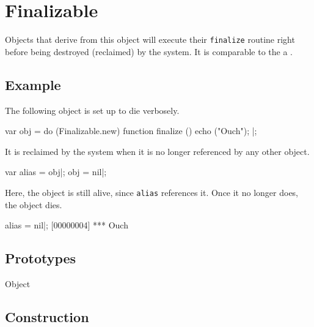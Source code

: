 
\section{Finalizable}

Objects that derive from this object will execute their
\lstinline|finalize| routine right before being destroyed (reclaimed)
by the system.  It is comparable to the a .

\subsection{Example}

The following object is set up to die verbosely.

\begin{urbiscript}
var obj =
  do (Finalizable.new)
  {
    function finalize ()
    {
      echo ("Ouch");
    }
  }|;
\end{urbiscript}

\noindent
It is reclaimed by the system when it is no longer referenced by any
other object.

\begin{urbiscript}
var alias = obj|;
obj = nil|;
\end{urbiscript}

\noindent
Here, the object is still alive, since \lstinline|alias| references
it.   Once it no longer does, the object dies.

\begin{urbiscript}
alias = nil|;
[00000004] *** Ouch
\end{urbiscript}

\subsection{Prototypes}

\begin{refObjects}
\item[Object]
\end{refObjects}

\subsection{Construction}

